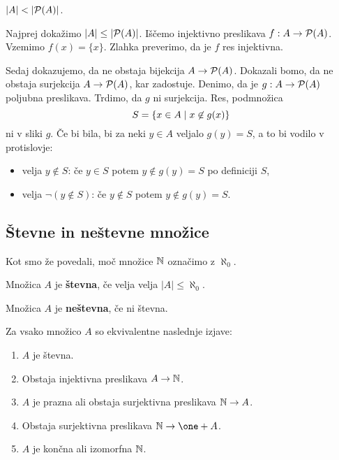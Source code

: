 \begin{izrek}[Cantor]
  $|A| < |\mathcal{P}(A)|$.
\end{izrek}

\begin{dokaz}
  Najprej dokažimo $|A| \leq |\mathcal{P}(A)|$. Iščemo injektivno preslikava $f : A \to \mathcal{P}(A)$. Vzemimo $f(x) = \{x\}$. Zlahka preverimo, da je $f$ res injektivna.

  Sedaj dokazujemo, da ne obstaja bijekcija $A \to \mathcal{P}(A)$. Dokazali bomo, da ne obstaja surjekcija $A \to \mathcal{P}(A)$, kar zadostuje. Denimo, da je $g : A \to \mathcal{P}(A)$ poljubna preslikava. Trdimo, da $g$ ni surjekcija. Res, podmnožica
  \begin{equation*}
    S = \left\{x \in A \mid x \not\in g(x) \right\}
  \end{equation*}
  ni v sliki $g$. Če bi bila, bi za neki $y \in A$ veljalo $g(y) = S$, a to bi vodilo v protislovje:
  \begin{itemize}
  \item velja $y \not\in S$: če $y \in S$ potem $y \not\in g(y) = S$ po definiciji $S$,
  \item velja $\lnot (y \not\in S)$: če $y \not\in S$ potem $y \not\in g(y) = S$.
  \end{itemize}
\end{dokaz}


\subsection{Števne in neštevne množice}

Kot smo že povedali, moč množice $\mathbb{N}$ označimo z $\aleph_0$.

\begin{definicija}
  Množica $A$ je \textbf{števna}, če velja velja $|A| \leq \aleph_0$.
\end{definicija}

\begin{definicija}
  Množica $A$ je \textbf{neštevna}, če ni števna.
\end{definicija}

\begin{izrek}
  Za vsako množico $A$ so ekvivalentne naslednje izjave:
  \begin{enumerate}
  \item $A$ je števna.
  \item Obstaja injektivna preslikava $A \to \mathbb{N}$.
  \item $A$ je prazna ali obstaja surjektivna preslikava $\mathbb{N} \to A$.
  \item Obstaja surjektivna preslikava $\NN \to \one + A$.
  \item $A$ je končna ali izomorfna $\mathbb{N}$.
  \end{enumerate}
\end{izrek}

